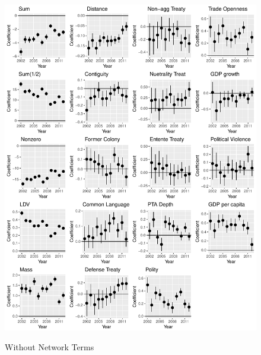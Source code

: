 \documentclass{article}
\begin{document}
\begin{figure}[h]
\centering
\includegraphics[scale=.75]{draft_figures/rl_plot_wo.pdf}\\
  \caption{Without Network Terms}
  \label{fig:1}
\end{figure}
\end{document}

